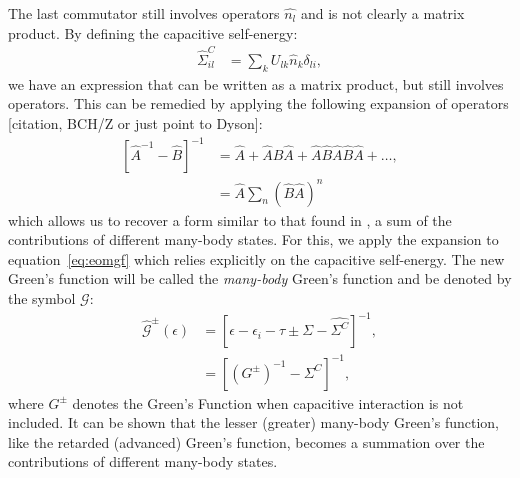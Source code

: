 \documentclass{article}
\newcommand{\red}[1]{ {\color{red} #1}}
\begin{document}
\begin{multicols}{2}
        The last commutator still involves operators $\hat{n_l}$ and is not clearly a matrix product. By defining the capacitive self-energy: 
        \begin{align*}
        \hat{\Sigma}^C_{il} &= \sum_k U_{lk} \hat{n}_k \delta_{li},
        \end{align*}
        we have an expression that can be written as a matrix product, but still involves operators. This can be remedied by applying the following expansion of operators\red{[citation, BCH/Z or just point to Dyson]}:
        \begin{align}
        \left[ \hat{A}^{-1} - \hat{B}\right]^{-1} &=\hat{A} + \hat{A}\hat{B}\hat{A} + \hat{A}\hat{B}\hat{A}\hat{B}\hat{A} + \ldots,
         \nonumber\\
        &= \hat{A} \sum_n \left(\hat{B}\hat{A}\right)^n\label{eq:expansion}
        \end{align} 
        which allows us to recover a form similar to that found in \citet{haugjauho}, a sum of the contributions of different many-body states. For this, we apply the expansion to equation~\ref{eq:eomgf} which relies explicitly on the capacitive self-energy. The new Green's function will be called the \emph{many-body} Green's function and be denoted by the symbol $\mathscr{G}$:
        \begin{align}
            \mathscr{\hat{G}}^\pm(\epsilon) &= \left[ \epsilon - \epsilon_i - \tau \pm \Sigma - \hat{\Sigma^C}\right]^{-1}, \\
            &= \left[ \left(G^\pm\right)^{-1}- \hat{\Sigma^C}\right]^{-1} ,\nonumber
        \end{align}
        where $G^\pm$ denotes the Green's Function when capacitive interaction is not included. It can be shown that the lesser (greater) many-body Green's function, like the retarded (advanced) Green's function, becomes a summation over the contributions of different many-body states.
        

\end{multicols}
\end{document}
